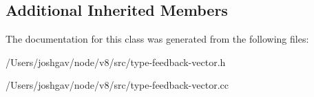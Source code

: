 \subsection*{Additional Inherited Members}


The documentation for this class was generated from the following files\+:\begin{DoxyCompactItemize}
\item 
/\+Users/joshgav/node/v8/src/type-\/feedback-\/vector.\+h\item 
/\+Users/joshgav/node/v8/src/type-\/feedback-\/vector.\+cc\end{DoxyCompactItemize}
